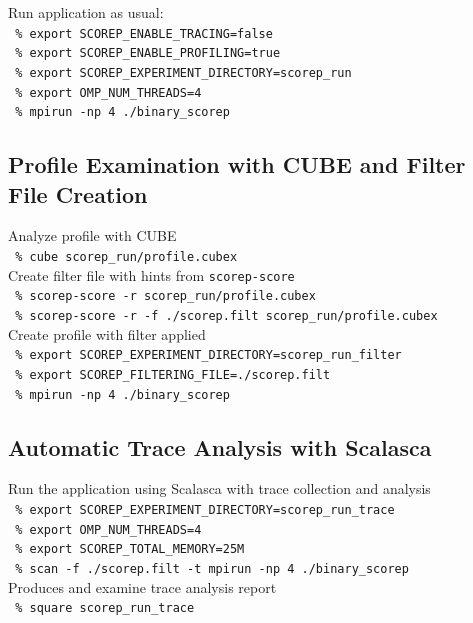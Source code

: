 \setlength{\topskip}{3em}
Run application as usual:\\
\texttt{ \% export SCOREP\_ENABLE\_TRACING=false}\\
\texttt{ \% export SCOREP\_ENABLE\_PROFILING=true}\\
\texttt{ \% export SCOREP\_EXPERIMENT\_DIRECTORY=scorep\_run}\\
\texttt{ \% export OMP\_NUM\_THREADS=4}\\
\texttt{ \% mpirun -np 4 ./binary\_scorep}\\

\vspace{1em}

\subsection{Profile Examination with CUBE and Filter File Creation}
Analyze profile with CUBE\\
\texttt{ \% cube scorep\_run/profile.cubex}\\
Create filter file with hints from \texttt{scorep-score}\\
\texttt{ \% scorep-score -r scorep\_run/profile.cubex}\\
\texttt{ \% scorep-score -r -f ./scorep.filt scorep\_run/profile.cubex}\\
Create profile with filter applied\\
\texttt{ \% export SCOREP\_EXPERIMENT\_DIRECTORY=scorep\_run\_filter}\\
\texttt{ \% export SCOREP\_FILTERING\_FILE=./scorep.filt}\\
\texttt{ \% mpirun -np 4 ./binary\_scorep}\\


\subsection{Automatic Trace Analysis with Scalasca}
Run the application using Scalasca with trace collection and analysis\\
\texttt{ \% export SCOREP\_EXPERIMENT\_DIRECTORY=scorep\_run\_trace}\\
\texttt{ \% export OMP\_NUM\_THREADS=4}\\
\texttt{ \% export SCOREP\_TOTAL\_MEMORY=25M}\\
\texttt{ \% scan -f ./scorep.filt -t mpirun -np 4 ./binary\_scorep}\\
Produces and examine trace analysis report\\
\texttt{ \% square scorep\_run\_trace}\\

